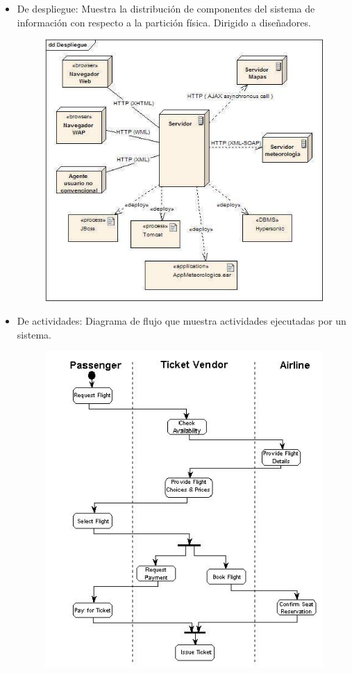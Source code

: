 \documentclass[12pt, twoside, openright]{report} %
\begin{document}
\begin{itemize}
      \begin{itemize}
      \item
        De despliegue: Muestra la distribución de componentes del
        sistema de información con respecto a la partición física.
        Dirigido a diseñadores.
		\begin{figure}[H]
			{\includegraphics[scale=.4]{Untitled 12.png}}
		\end{figure}
		\pagebreak
      \item
        De actividades: Diagrama de flujo que muestra actividades
        ejecutadas por un sistema.
		\begin{figure}[H]
			{\includegraphics[scale=.5]{Untitled 13.png}}

\end{figure}
\end{itemize}
\end{itemize}
\end{document}
